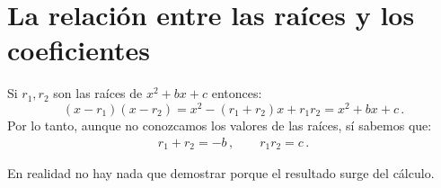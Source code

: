 \vspace*{-3ex}

\section{La relación entre las raíces y los coeficientes}\label{s.computing}

\begin{theorem}\label{thm.roots-coefficients}
Si $r_1,r_2$ son las raíces de $x^2+bx+c$ entonces:
\[
(x-r_1)(x-r_2)=x^2 - (r_1+r_2)x + r_1r_2=x^2+bx+c\,.
\]
Por lo tanto, aunque no conozcamos los valores de las raíces, sí sabemos que:
\begin{align}\label{eq.viete-quad}
r_1+r_2 = -b\,,\quad\quad r_1r_2=c\,.
\end{align}
\end{theorem}
\noindent{}En realidad no hay nada que demostrar porque el resultado surge del cálculo.

